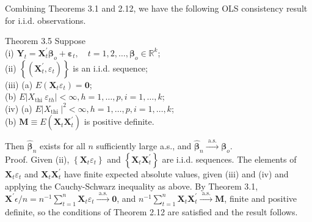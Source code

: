 \documentclass[10pt]{article}
\begin{document}
Combining Theorems 3.1 and 2.12, we have the following OLS consistency result for i.i.d. observations.

Theorem 3.5 Suppose\\
(i) $\mathbf{Y}_{t}=\mathbf{X}_{t}^{\prime} \boldsymbol{\beta}_{o}+\boldsymbol{\varepsilon}_{t}, \quad t=1,2, \ldots, \boldsymbol{\beta}_{o} \in \mathbb{R}^{k}$;\\
(ii) $\left\{\left(\mathbf{X}_{t}^{\prime}, \varepsilon_{t}\right)\right\}$ is an i.i.d. sequence;\\
(iii) (a) $E\left(\mathbf{X}_{t} \varepsilon_{t}\right)=\mathbf{0}$;\\
(b) $E\left|X_{\text {thi }} \varepsilon_{t h}\right|<\infty, h=1, \ldots, p, i=1, \ldots, k$;\\
(iv) (a) $E\left|X_{\text {thi }}\right|^{2}<\infty, h=1, \ldots, p, i=1, \ldots, k$;\\
(b) $\mathbf{M} \equiv E\left(\mathbf{X}_{t} \mathbf{X}_{t}^{\prime}\right)$ is positive definite.

Then $\hat{\boldsymbol{\beta}}_{n}$ exists for all $n$ sufficiently large a.s., and $\hat{\boldsymbol{\beta}}_{n} \xrightarrow{\text { a.s. }} \boldsymbol{\beta}_{o}$.\\
Proof. Given (ii), $\left\{\mathbf{X}_{t} \varepsilon_{t}\right\}$ and $\left\{\mathbf{X}_{t} \mathbf{X}_{t}^{\prime}\right\}$ are i.i.d. sequences. The elements of $\mathbf{X}_{t} \varepsilon_{t}$ and $\mathbf{X}_{t} \mathbf{X}_{t}^{\prime}$ have finite expected absolute values, given (iii) and (iv) and applying the Cauchy-Schwarz inequality as above. By Theorem 3.1,\\
$\mathbf{X}^{\prime} \epsilon / n=n^{-1} \sum_{t=1}^{n} \mathbf{X}_{t} \varepsilon_{t} \xrightarrow{\text { a.s. }} \mathbf{0}$, and $n^{-1} \sum_{t=1}^{n} \mathbf{X}_{t} \mathbf{X}_{t}^{\prime} \xrightarrow{\text { a.s. }} \mathbf{M}$, finite and positive definite, so the conditions of Theorem 2.12 are satisfied and the result follows.
\end{document}
